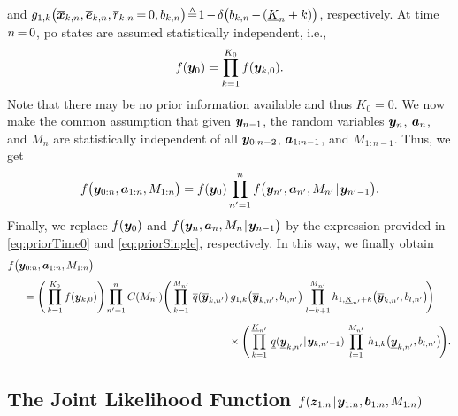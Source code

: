\documentclass[11pt,a4paper]{article}
\newcommand{\ist}{\hspace*{.3mm}}
\newcommand{\rmv}{\hspace*{-.3mm}}
\newcommand{\nn}{\nonumber}
\begin{document}
and $g_{1,k}\big( \overline{\V{x}}_{k,n}, \overline{\V{e}}_{k,n}, \overline{r}_{k,n} \rmv=\rmv 0,  b_{k,n}\big) \rmv\rmv\triangleq\rmv\rmv 1 \rmv - \rmv \delta \big( b_{k,n} \rmv - \rmv ( \underline{K}_n + k ) \big)$, respectively. 
At time $n \rmv=\rmv0$, \ac{po} states are assumed statistically independent, \vspace{-1.5mm} i.e.,
\begin{equation}
 f(\V{y}_{0}) =  \prod^{K_0}_{k = 1} f(\V{y}_{k,0}).  \label{eq:priorTime0}
 \vspace{1mm}
\end{equation}
Note that there may be no prior information available and thus $K_0 = 0$. We now make the common assumption \cite{MeyKroWilLauHlaBraWin:J18,GraFatSve:J19} that given $\bm{y}_{n-1}$, the random variables $\bm{y}_{n}$, $\bm{a}_{n}$, and $M_{n}$ are statistically independent of all $\bm{y}_{0:n-2}$, $\bm{a}_{1:n-1}$, and $M_{1:n-1}$. Thus, we \vspace{-.5mm} get
\begin{equation}
f\big(\V{y}_{0:n}, \V{a}_{1:n}, M_{1:n} \big) = f( \V{y}_{0}) \prod^{n}_{n' = 1} f\big(\V{y}_{n'}, \V{a}_{n'}, M_{n'} \ist | \ist \V{y}_{n'-1}\big). 
\end{equation}
Finally, we replace $f( \bm{y}_{0})$ and $f\big(\V{y}_{n}, \V{a}_{n}, M_{n} \ist | \ist \V{y}_{n-1}\big)$ by the expression provided in \eqref{eq:priorTime0} and \eqref{eq:priorSingle}, respectively. In this way, we \vspace{1mm} finally obtain
\begin{align}
&f\big(\V{y}_{0:n}, \V{a}_{1:n}, M_{1:n} \big) \nn\\[1mm]
&\hspace{5mm}= \Bigg( \prod^{K_0}_{k = 1} f(\V{y}_{k,0})  \Bigg) \rmv \prod^{n}_{n' = 1}C(M_{n'})  \Bigg( \prod^{M_{n'}}_{k = 1} \ist \ist  \overline{q}(\overline{\V{y}}_{k,n'}) \ist\ist g_{1,k}\big( \overline{\V{y}}_{k,n'}, b_{l,n'} \big) \ist \prod^{M_{n'}}_{l=k+1} h_{1,\underline{K}_{n'} + k}\big( \overline{\V{y}}_{k,n'}, b_{l,n'} \big) \rmv\rmv\Bigg)  \nn\\[1.5mm]
&\hspace{73mm}\times \Bigg(\prod^{\underline{K}_{n'}}_{k = 1} \ist\ist \underline{q}(\underline{\V{y}}_{k,n'} \ist | \ist \V{y}_{k,n'-1} ) \ist\ist \prod^{M_{n'}}_{l=1} \ist\ist h_{1,k}\big( \underline{\V{y}}_{k,n'}, b_{l,n'} \big) \rmv\rmv \Bigg) . \label{eq:PriorFinal}
\end{align}

\subsection{The Joint Likelihood Function $f(\V{z}_{1:n} \ist | \ist \V{y}_{1:n}, \V{b}_{1:n}, M_{1:n})$}
\label{sec:jointLikelihoodFunction}
\end{document}
